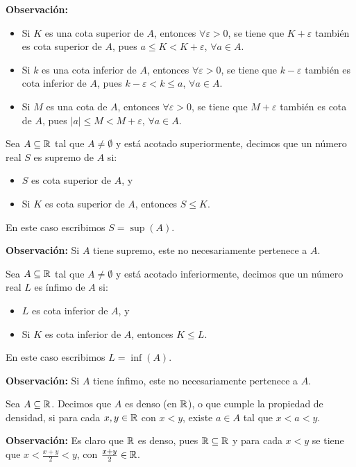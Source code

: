 \textbf{Observación:}
\begin{itemize}
  \item Si $K$ es una cota superior de $A$, entonces $\forall \varepsilon>0$, se tiene que $K+\varepsilon$ también es cota superior de $A$, pues $a \leq K<K+\varepsilon$, $\forall a\in A$. 
  \item Si $k$ es una cota inferior de $A$, entonces $\forall \varepsilon>0$, se tiene que $k - \varepsilon$ también es cota inferior de $A$, pues $k - \varepsilon < k \leq a$, $\forall a\in A$.
  \item Si $M$ es una cota de $A$, entonces $\forall \varepsilon>0$, se tiene que $M+\varepsilon$ también es cota de $A$, pues $|a|\leq M < M+\varepsilon$, $\forall a\in A$.
\end{itemize}

  Sea $A\subseteq \mathbb{R}$ tal que $A\neq \emptyset$ y está acotado superiormente, decimos que un número real $S$ es supremo de $A$ si:
\begin{itemize}
 \item $S$ es cota superior de $A$, y
 \item Si $K$ es cota superior de $A$, entonces $S\leq K$.%
\end{itemize}

En este caso escribimos $S=\sup(A)$.

\textbf{Observación:} Si $A$ tiene supremo, este no necesariamente pertenece a $A$.

\clearpage\pagebreak

 Sea $A\subseteq \mathbb{R}$ tal que $A\neq \emptyset$ y está acotado inferiormente, decimos que un número real $L$ es ínfimo de $A$ si: \begin{itemize}
 \item $L$ es cota inferior de $A$, y
 \item Si $K$ es cota inferior de $A$, entonces $K\leq L$.
\end{itemize}

En este caso escribimos $L=\inf(A)$.

\textbf{Observación:} Si $A$ tiene ínfimo, este no necesariamente pertenece a $A$.

 Sea $A\subseteq \mathbb{R}$. Decimos que $A$ es denso (en $\mathbb{R}$), o que cumple la propiedad de densidad, si para cada $x,y \in \mathbb{R}$ con $x<y$, existe $a\in A$ tal que $x<a<y$.

\textbf{Observación:} Es claro que $\mathbb{R}$ es denso, pues $\mathbb{R}\subseteq \mathbb{R}$ y para cada $x<y$ se tiene que $x<\frac{x+y}{2}<y$, con $\frac{x+y}{2}\in \mathbb{R}$.

